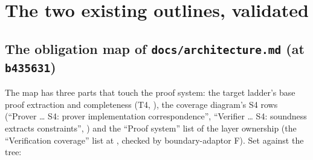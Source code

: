\section{The two existing outlines, validated}\label{sec:obl-outlines}

\subsection{The obligation map of \texttt{docs/architecture.md} (at \texttt{b435631})}\label{sec:obl-archmap}

The map has three parts that touch the proof system: the target ladder's base proof extraction and completeness (T4, ), the coverage diagram's S4 rows (``Prover … S4: prover implementation correspondence'', ``Verifier … S4: soundness extracts constraints'', ) and the ``Proof system'' list of the layer ownership (the ``Verification coverage'' list at , checked by boundary-adaptor F). Set against the tree:

